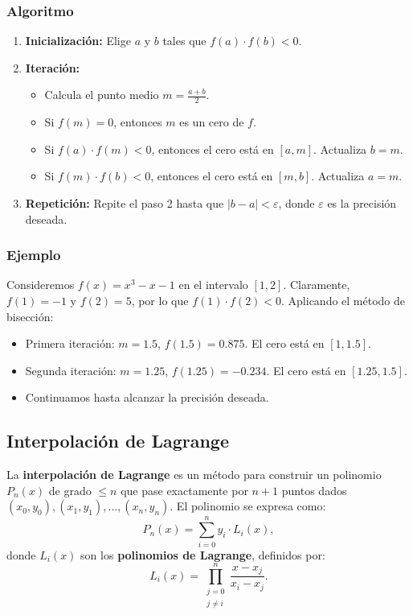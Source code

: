 \documentclass[12pt, a4paper]{article}
\theoremstyle{rioplatense}
\begin{document}
\subsubsection{Algoritmo}
\begin{enumerate}
    \item \textbf{Inicialización:} Elige $a$ y $b$ tales que $f(a) \cdot f(b) < 0$.
    \item \textbf{Iteración:}
          \begin{itemize}
              \item Calcula el punto medio $m = \frac{a + b}{2}$.
              \item Si $f(m) = 0$, entonces $m$ es un cero de $f$.
              \item Si $f(a) \cdot f(m) < 0$, entonces el cero está en $[a, m]$. Actualiza $b = m$.
              \item Si $f(m) \cdot f(b) < 0$, entonces el cero está en $[m, b]$. Actualiza $a = m$.
          \end{itemize}
    \item \textbf{Repetición:} Repite el paso 2 hasta que $|b - a| < \varepsilon$, donde $\varepsilon$ es la precisión deseada.
\end{enumerate}

\subsubsection{Ejemplo}
Consideremos $f(x) = x^3 - x - 1$ en el intervalo $[1, 2]$. Claramente, $f(1) = -1$ y $f(2) = 5$, por lo que $f(1) \cdot f(2) < 0$. Aplicando el método de bisección:
\begin{itemize}
    \item Primera iteración: $m = 1.5$, $f(1.5) = 0.875$. El cero está en $[1, 1.5]$.
    \item Segunda iteración: $m = 1.25$, $f(1.25) = -0.234$. El cero está en $[1.25, 1.5]$.
    \item Continuamos hasta alcanzar la precisión deseada.
\end{itemize}



\subsection{Interpolación de Lagrange}

La \textbf{interpolación de Lagrange} es un método para construir un polinomio \( P_n(x) \) de grado \( \leq n \) que pase exactamente por \( n+1 \) puntos dados \( (x_0, y_0), (x_1, y_1), \dots, (x_n, y_n) \). El polinomio se expresa como:
\[
P_n(x) = \sum_{i=0}^n y_i \cdot L_i(x),
\]
donde \( L_i(x) \) son los \textbf{polinomios de Lagrange}, definidos por:
\[
L_i(x) = \prod_{\substack{j=0 \\ j \neq i}}^n \frac{x - x_j}{x_i - x_j}.
\]
\end{document}
